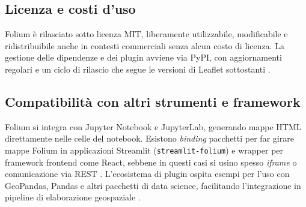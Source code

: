 \subsection{Licenza e costi d'uso}  
Folium è rilasciato sotto licenza MIT, liberamente utilizzabile, modificabile e ridistribuibile anche in contesti commerciali senza alcun costo di licenza.  
La gestione delle dipendenze e dei plugin avviene via PyPI, con aggiornamenti regolari e un ciclo di rilascio che segue le versioni di Leaflet sottostanti \cite{folium-lic,folium-pypi}.

\subsection{Compatibilità con altri strumenti e framework}  
Folium si integra con Jupyter Notebook e JupyterLab, generando mappe HTML  direttamente nelle celle del notebook.  
Esistono \textit{binding} pacchetti per far girare mappe Folium in applicazioni Streamlit (\texttt{streamlit-folium}) e wrapper per framework frontend come React, sebbene in questi casi si usino spesso \textit{iframe} o comunicazione via REST \cite{folium-github,folium-react}.  
L'ecosistema di plugin ospita esempi per l'uso con GeoPandas, Pandas e altri pacchetti di data science, facilitando l'integrazione in pipeline di elaborazione geospaziale \cite{folium-doc,folium-userguide}.

\newpage